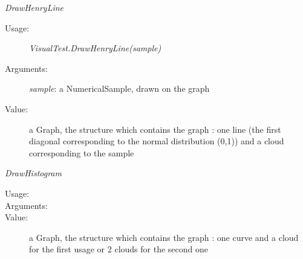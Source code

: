 \begin{description}
\begin{description}
\item \textit{DrawHenryLine}
\begin{description}
\item[Usage:] \textit{VisualTest.DrawHenryLine(sample)}
\item[Arguments:] \textit{sample}: a NumericalSample, drawn on the graph
\item[Value:]  a Graph, the structure which contains the graph : one line (the first diagonal corresponding to the normal distribution (0,1)) and a cloud corresponding to the sample
\end{description}
\bigskip

\item \textit{DrawHistogram}
\begin{description}
\item[Usage:] \rule{0pt}{1em}
\item[Arguments:] \rule{0pt}{1em}
\item[Value:]  a Graph, the structure which contains the graph : one curve and a cloud for the first usage or 2 clouds for the second one
\end{description}
\bigskip


\end{description}
\end{description}
